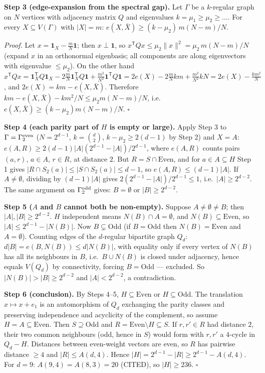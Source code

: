 \documentclass[11pt,a4paper]{article}
\begin{document}
\textbf{Step 3 (edge-expansion from the spectral gap).} Let \(\Gamma\)
be a \(k\)-regular graph on \(N\) vertices with adjacency matrix \(Q\)
and eigenvalues \(k=\mu_1\ge\mu_2\ge\dots\). For every
\(X\subseteq V(\Gamma)\) with \(|X|=m\):
\(e(X,\bar X)\ge(k-\mu_2)\,m(N-m)/N\).

\emph{Proof.} Let \(x=\mathbf 1_X-\tfrac mN\mathbf 1\); then
\(x\perp\mathbf 1\), so
\(x^{\mathsf T}Qx\le\mu_2\|x\|^2=\mu_2\,m(N-m)/N\) (expand \(x\) in an
orthonormal eigenbasis; all components are along eigenvectors with
eigenvalue \(\le\mu_2\)). On the other hand
\(x^{\mathsf T}Qx=\mathbf 1_X^{\mathsf T}Q\mathbf 1_X-2\tfrac mN\mathbf 1_X^{\mathsf T}Q\mathbf 1+\tfrac{m^2}{N^2}\mathbf 1^{\mathsf T}Q\mathbf 1=2e(X)-2\tfrac mN km+\tfrac{m^2}{N^2}kN=2e(X)-\tfrac{km^2}{N}\),
and \(2e(X)=km-e(X,\bar X)\). Therefore
\(km-e(X,\bar X)-km^2/N\le\mu_2 m(N-m)/N\),
i.e.~\(e(X,\bar X)\ge(k-\mu_2)m(N-m)/N\). \(\square\)

\textbf{Step 4 (each parity part of \(H\) is empty or large).} Apply
Step 3 to \(\Gamma=\Gamma_2^{\rm even}\) (\(N=2^{d-1}\),
\(k=\binom d2\), \(k-\mu_2\ge2(d-1)\) by Step 2) and \(X=A\):
\(e(A,R)\ge 2(d-1)|A|(2^{d-1}-|A|)/2^{d-1}\), where \(e(A,R)\) counts
pairs \((a,r)\), \(a\in A\), \(r\in R\), at distance \(2\). But
\(R=S\cap\text{Even}\), and for \(a\in A\subseteq H\) Step 1 gives
\(|R\cap S_2(a)|\le|S\cap S_2(a)|\le d-1\), so \(e(A,R)\le(d-1)|A|\). If
\(A\neq\emptyset\), dividing by \((d-1)|A|\) gives
\(2(2^{d-1}-|A|)/2^{d-1}\le1\), i.e.~\(|A|\ge2^{d-2}\). The same
argument on \(\Gamma_2^{\rm odd}\) gives: \(B=\emptyset\) or
\(|B|\ge2^{d-2}\).

\textbf{Step 5 (\(A\) and \(B\) cannot both be non-empty).} Suppose
\(A\ne\emptyset\ne B\); then \(|A|,|B|\ge2^{d-2}\). \(H\) independent
means \(N(B)\cap A=\emptyset\), and \(N(B)\subseteq\text{Even}\), so
\(|A|\le2^{d-1}-|N(B)|\). Now \(B\subsetneq\text{Odd}\) (if
\(B=\text{Odd}\) then \(N(B)=\text{Even}\) and \(A=\emptyset\)).
Counting edges of the \(d\)-regular bipartite graph \(Q_d\):
\(d|B|=e(B,N(B))\le d|N(B)|\), with equality only if every vertex of
\(N(B)\) has all its neighbours in \(B\), i.e.~\(B\cup N(B)\) is closed
under adjacency, hence equals \(V(Q_d)\) by connectivity, forcing
\(B=\text{Odd}\) --- excluded. So \(|N(B)|>|B|\ge2^{d-2}\) and
\(|A|<2^{d-2}\), a contradiction.

\textbf{Step 6 (conclusion).} By Steps 4--5, \(H\subseteq\text{Even}\)
or \(H\subseteq\text{Odd}\). The translation \(x\mapsto x+e_1\) is an
automorphism of \(Q_d\) exchanging the parity classes and preserving
independence and acyclicity of the complement, so assume
\(H=A\subseteq\text{Even}\). Then \(S\supseteq\text{Odd}\) and
\(R=\text{Even}\setminus H\subseteq S\). If \(r,r'\in R\) had distance
\(2\), their two common neighbours (odd, hence in \(S\)) would form with
\(r,r'\) a \(4\)-cycle in \(Q_d-H\). Distances between even-weight
vectors are even, so \(R\) has pairwise distance \(\ge4\) and
\(|R|\le A(d,4)\). Hence \(|H|=2^{d-1}-|R|\ge2^{d-1}-A(d,4)\). For
\(d=9\): \(A(9,4)=A(8,3)=20\) (CITED), so \(|H|\ge236\). \(\square\)
\end{document}
